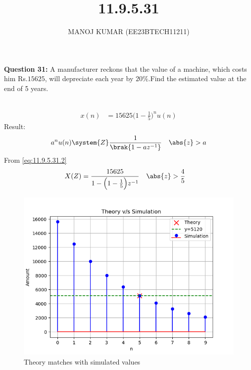 \documentclass[journal,12pt,twocolumn]{IEEEtran}
\theoremstyle{remark}
\begin{document}

\vspace{3cm}

\title{11.9.5.31}
\author{MANOJ KUMAR (EE23BTECH11211)}
\maketitle
\newpage

\bigskip

\renewcommand{\thefigure}{\theenumi}
\renewcommand{\thetable}{\theenumi}
\textbf{Question 31:}
A manufacturer reckons that the value of a machine, which costs him Rs.$15625$, will depreciate each year by $20\%$.Find the estimated value at the end of 5 years.\\
\solution\\
\fi

 \begin{align}
     x(n) &= 15625 \Big(1-\frac{1}{5}\Big)^{n}u(n)
 \end{align}
 Result:
 \begin{align}
  a^nu(n)\system{Z} \frac{1}{\brak{1-az^{-1}}}\quad\abs{z}>{a} 
  \label{eq:11.9.5.31.2}	 
  \end{align}
 From \eqref{eq:11.9.5.31.2}
\begin{align}
    X(Z) &= \frac{15625}{1 - \Big(1-\frac{1}{5}\Big)z^{-1}} \quad\abs{z}>\frac{4}{5}
\end{align}
 \begin{figure}[!ht]
    \centering
    \includegraphics[width=1\linewidth]{ncert-maths/11/9/5/31/figs/plot2.png}
    \caption{Theory matches with simulated values}
\end{figure}
\end{document}
